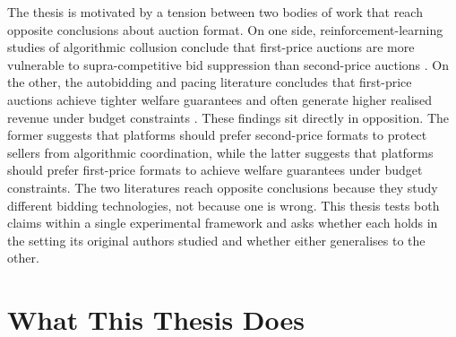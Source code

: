 The thesis is motivated by a tension between two bodies of work that reach opposite conclusions about auction format. On one side, reinforcement-learning studies of algorithmic collusion conclude that first-price auctions are more vulnerable to supra-competitive bid suppression than second-price auctions \citep{BanchioSkrzypacz2022, Calvano2020, Klein2021}. On the other, the autobidding and pacing literature concludes that first-price auctions achieve tighter welfare guarantees and often generate higher realised revenue under budget constraints \citep{Aggarwal2019, Balseiro2019Learning, Conitzer2022FPPE, Gaitonde2023}. These findings sit directly in opposition. The former suggests that platforms should prefer second-price formats to protect sellers from algorithmic coordination, while the latter suggests that platforms should prefer first-price formats to achieve welfare guarantees under budget constraints. The two literatures reach opposite conclusions because they study different bidding technologies, not because one is wrong. This thesis tests both claims within a single experimental framework and asks whether each holds in the setting its original authors studied and whether either generalises to the other.

\section{What This Thesis Does}
\label{sec:intro_what}

